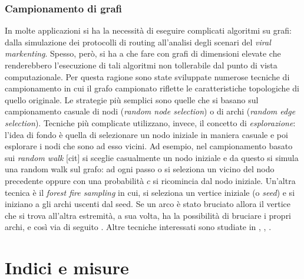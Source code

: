 \subsubsection{Campionamento di grafi}
In molte applicazioni si ha la necessit\`a di eseguire complicati algoritmi su grafi: dalla simulazione dei protocolli di routing all'analisi degli scenari del \textit{viral markenting}. Spesso, per\`o, si ha a che fare con grafi di dimensioni elevate che renderebbero l'esecuzione di tali algoritmi non tollerabile dal punto di vista computazionale. Per questa ragione sono state sviluppate numerose tecniche di campionamento in cui il grafo campionato riflette le caratteristiche topologiche di quello originale. Le strategie pi\`u semplici sono quelle che si basano sul campionamento casuale di nodi (\textit{random node selection}) o di archi (\textit{random edge selection}). 
Tecniche pi\`u complicate utilizzano, invece, il concetto di \textit{esplorazione}: l'idea di fondo \`e quella di selezionare un nodo iniziale in maniera casuale e poi esplorare i nodi che sono ad esso vicini. Ad esempio, nel campionamento basato sui \textit{random walk} [cit] si sceglie casualmente un nodo iniziale e da questo si simula una random walk sul grafo: ad ogni passo o si seleziona un vicino del nodo precedente oppure con una probabilit\`a $ c $ si ricomincia dal nodo iniziale. Un'altra tecnica \`e il \textit{forest fire sampling} in cui, si seleziona un vertice iniziale (o \textit{seed}) e si iniziano a  gli archi uscenti dal seed. Se un arco \`e stato bruciato allora il vertice che si trova all'altra estremit\`a, a sua volta, ha la possibilit\`a di bruciare i propri archi, e cos\`i via di seguito \cite{Leskovec2006}. Altre tecniche interessati sono studiate in \cite{Krishnamurthy05}, \cite{Adler2001}, \cite{Airoldi05}.

\section{Indici e misure}
\label{section:indici_e_misure}
